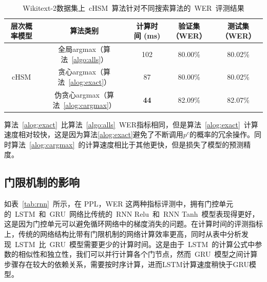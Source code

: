 \begin{table}[!ht]
  \centering
  \caption{Wikitext-2数据集上~cHSM~算法针对不同搜索算法的~WER~评测结果\label{tab:csearch}}
\begin{tabular}{ccccc}
  \toprule
  层次概率模型 & 算法类别&计算时间 (ms)&验证集（WER）& 测试集（WER）\\ \midrule
  \multirow{3}{*}{cHSM} &全局argmax（算法~\ref{algo:alls}）&102& 80.00\%& 80.02\%\\
        &贪心argmax（算法~\ref{alog:exact}）&87& 80.00\%& 80.02\%\\
        &伪贪心argmax（算法~\ref{alog:cargmax}）&\textbf{44}& 82.09\%&  82.07\%\\
  \bottomrule
\end{tabular}
\end{table}


算法~\ref{alog:exact}~比算法~\ref{algo:alls}~WER指标相同，但是算法~\ref{alog:exact}~计算速度相对较快，这是因为算法\ref{alog:exact}避免了不断调用$p^c$的概率的冗余操作。同时算法~\ref{alog:cargmax}~的计算速度相比于其他更快，但是损失了模型的预测精度。


\subsection{门限机制的影响}

如表~\ref{tab:rnn}~所示，在 PPL，WER 这两种指标评测中，拥有门控单元的~LSTM~和~GRU~网络比传统的~RNN Relu~和~RNN Tanh~模型表现得更好，这是因为门控单元可以避免循环网络中的梯度消失的问题。在计算时间的评测指标上，传统的网络结构比带有门限机制的网络计算效率更高，同时从表中分析发现~LSTM~比~GRU~模型需要更少的计算时间。这是由于~LSTM~的计算公式中参数的相似性和独立性，我们可以并行计算各个门节点，然而~GRU~模型之间计算步骤存在较大的依赖关系，需要按时序计算，进而LSTM计算速度稍快于GRU模型。

